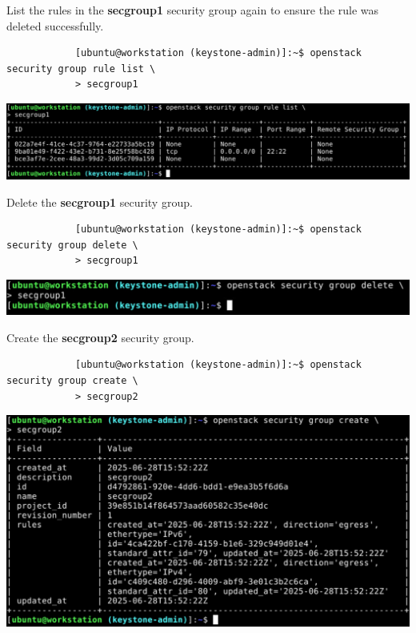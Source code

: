 \documentclass[letterpaper, 12pt]{article}
\begin{document}
\begin{enumerate}
    \begin{labstep}
        List the rules in the \textbf{secgroup1} security group again to ensure the rule was deleted successfully.
        \begin{lstlisting}
            [ubuntu@workstation (keystone-admin)]:~$ openstack security group rule list \
            > secgroup1
        \end{lstlisting}

        \begin{center}
            \includegraphics[width=\linewidth]{images/part1/step15.png}
        \end{center}
    \end{labstep}

    \begin{labstep}
        Delete the \textbf{secgroup1} security group.
        \begin{lstlisting}
            [ubuntu@workstation (keystone-admin)]:~$ openstack security group delete \
            > secgroup1
        \end{lstlisting}

        \begin{center}
            \includegraphics[width=\linewidth]{images/part1/step16.png}
        \end{center}
    \end{labstep}

    \begin{labstep}
        Create the \textbf{secgroup2} security group.
        \begin{lstlisting}
            [ubuntu@workstation (keystone-admin)]:~$ openstack security group create \
            > secgroup2
        \end{lstlisting}

        \begin{center}
            \includegraphics[width=\linewidth]{images/part1/step17.png}
        \end{center}
    \end{labstep}


\end{enumerate}
\end{document}
